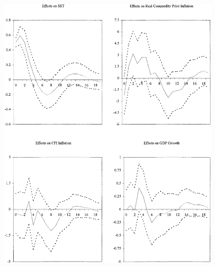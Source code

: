 \documentclass{beamer}
\begin{document}
\begin{frame}
  \begin{figure}
    \includegraphics[scale=.1]{brunner4.eps}
  \end{figure}
\end{frame}
\end{document}
